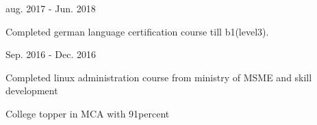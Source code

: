 

\begin{cventries}

  \cventry
    {} %
    {} %
    {} %
    {aug. 2017 - Jun. 2018} %
    {
      \begin{cvitems} %
        \item {Completed german language certification course till b1(level3).}
      \end{cvitems}
    }

  \cventry
    {} %
    {} %
    {} %
    {Sep. 2016 - Dec. 2016} %
    {
      \begin{cvitems} %
        \item {Completed linux administration course from ministry of MSME and skill development}
      \end{cvitems}
    }

\cventry
    {} %
    {} %
    {} %
    {} %
    {
      \begin{cvitems} %
        \item {College topper in MCA with 91percent  }
      \end{cvitems}
    }
\end{cventries}

